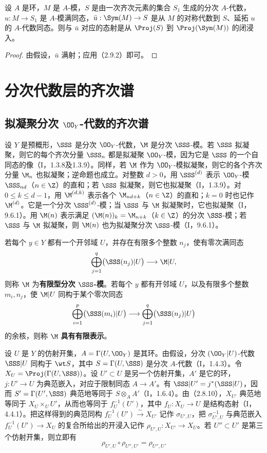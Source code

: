 设 $A$ 是环，$M$ 是 $A$-模，$S$ 是由一次齐次元素的集合 $S_1$ 生成的分次 $A$-代数，
$u:M\to S_1$ 是 $A$-模满同态，$\bar u:\Sym(M)\to S$ 是从 $M$ 的对称代数到 $S$、延拓 $u$ 的 $A$-代数同态。则与 $\bar u$ 对应的态射是从 $\Proj(S)$ 到 $\Proj(\Sym(M))$ 的闭浸入。
\begin{proof}
由假设，$\bar u$ 满射；应用（2.9.2）即可。
\end{proof}


\section{分次代数层的齐次谱}
\subsection{拟凝聚分次 \texorpdfstring{$\OO_Y$}{OY}-代数的齐次谱}
设 $Y$ 是预概形，$\SSS$ 是分次 $\OO_Y$-代数，$\M$ 是分次 $\SSS$-模。若 $\SSS$ 拟凝聚，则它的每个齐次分量 $\SSS_n$ 都是拟凝聚 $\OO_Y$-模，因为它是 $\SSS$ 的一个自同态的像（I，1.3.8及1.3.9）。同样，若 $\M$ 作为 $\OO_Y$-模拟凝聚，则它的各个齐次分量 $\M_n$ 也拟凝聚；逆命题也成立。对整数 $d>0$，用 $\SSS^{(d)}$ 表示 $\OO_Y$-模 $\SSS_{nd}$（$n\in\Z$）的直和；若 $\SSS$ 拟凝聚，则它也拟凝聚（I，1.3.9）。对 $0\leq k\leq d-1$，用 $\M^{(d,k)}$ 表示各个 $\M_{nd+k}$（$n\in\Z$）的直和；$k=0$ 时也记作 $\M^{(d)}$。它是一个分次 $\SSS^{(d)}$-模；当 $\SSS$ 与 $\M$ 拟凝聚时，它也拟凝聚（I，9.6.1）。用 $\M(n)$ 表示满足 $(\M(n))_k=\M_{n+k}$（$k\in\Z$）的分次 $\SSS$-模；若 $\SSS$ 与 $\M$ 拟凝聚，则 $\M(n)$ 也为拟凝聚分次 $\SSS$-模（I，9.6.1）。

若每个 $y\in Y$ 都有一个开邻域 $U$，并存在有限多个整数 $n_j$，使有零次满同态
\[
\bigoplus_{j=1}^{q}\bigl(\SSS(n_j)|U\bigr)\longrightarrow\M|U,
\]
则称 $\M$ 为\textbf{有限型分次 $\SSS$-模}。若每个 $y$ 都有开邻域 $U$，以及有限多个整数 $m_i,n_j$，使 $\M|U$ 同构于某个零次同态
\[
\bigoplus_{i=1}^{p}\bigl(\SSS(m_i)|U\bigr)\longrightarrow
\bigoplus_{j=1}^{q}\bigl(\SSS(n_j)|U\bigr)
\]
的余核，则称 $\M$ \textbf{具有有限表示}。

设 $U$ 是 $Y$ 的仿射开集，$A=\Gamma(U,\OO_Y)$ 是其环。由假设，分次 $(\OO_Y|U)$-代数 $\SSS|U$ 同构于 $\wt S$，其中 $S=\Gamma(U,\SSS)$ 是分次 $A$-代数（I，1.4.3）。令 $X_U=\Proj(\Gamma(U,\SSS))$。设 $U'\subset U$ 是另一个仿射开集，$A'$ 是它的环，$j:U'\to U$ 为典范嵌入，对应于限制同态 $A\to A'$。有 $\SSS|U'=j^*(\SSS|U)$，因而 $S'=\Gamma(U',\SSS)$ 典范地等同于 $S\otimes_A A'$（I，1.6.4）。由（2.8.10），$X_{U'}$ 典范地等同于 $X_U\times_U U'$，从而也等同于 $f_U^{-1}(U')$，其中 $f_U:X_U\to U$ 是结构态射（I，4.4.1）。把这样得到的典范同构 $f_U^{-1}(U')\xrightarrow{\sim}X_{U'}$ 记作 $\sigma_{U',U}$，把 $\sigma_{U',U}^{-1}$ 与典范嵌入 $f_U^{-1}(U')\to X_U$ 的复合所给出的开浸入记作 $\rho_{U',U}:X_{U'}\to X_U$。若 $U''\subset U'$ 是第三个仿射开集，则立即有
\[
\rho_{U',U}\circ\rho_{U'',U'}=\rho_{U'',U}.
\]

